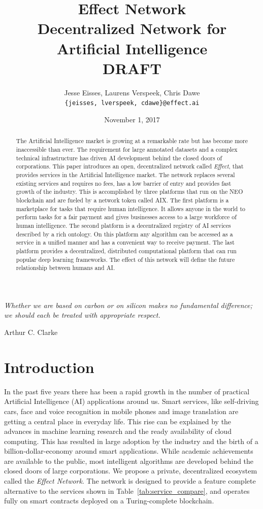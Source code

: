 \documentclass{article}
\title{Effect Network \\ \LARGE{Decentralized Network for Artificial Intelligence} \\ \vspace{24pt} \Large DRAFT}
\date{November 1, 2017}
\author{Jesse Eisses, Laurens Verspeek, Chris Dawe \\
  \small \texttt{\{jeisses, lverspeek, cdawe\}@effect.ai}}
\begin{document}
\maketitle
\thispagestyle{empty}

\begin{abstract}
  The Artificial Intelligence market is growing at a remarkable rate
  but has become more inaccessible than ever. The requirement for large 
  annotated datasets and a complex technical infrastructure has driven AI 
  development behind the closed doors of corporations. This paper 
  introduces an open, decentralized network called
  \emph{Effect}, that provides services in the Artificial Intelligence
  market. The network replaces several existing services and requires
  no fees, has a low barrier of entry and provides fast growth of the industry. 
  This is accomplished by three platforms that run on the NEO~\cite{neo}
  blockchain and are fueled by a network token called AIX. The first
  platform is a marketplace for tasks that require human
  intelligence. It allows anyone in the world 
  to perform tasks for a fair payment and gives businesses access
  to a large workforce of human intelligence. The second platform is a
  decentralized registry of AI services described by a rich
  ontology. On this platform any algorithm can be accessed as a 
  service in a unified manner and has a convenient way to receive payment. The last
  platform provides a decentralized, distributed computational
  platform that can run popular deep learning frameworks.
  The effect of this network will define the future relationship between humans and AI.
\end{abstract}
\nonumber
\newpage

\tableofcontents
\newpage

\epigraph{\textit{Whether we are based on carbon or on silicon makes
    no fundamental difference; we should each be treated with
    appropriate respect.}}{Arthur C. Clarke}

\section{Introduction}
In the past five years there has been a rapid growth in the number of
practical Artificial Intelligence (AI) applications around us. Smart
services, like self-driving cars, face and voice recognition in mobile
phones and image translation are getting a central place in everyday
life. This rise can be explained by the advances in machine learning
research and the ready availability of cloud computing. This has
resulted in large adoption by the industry and the birth of a
billion-dollar-economy around smart applications. While academic achievements are
available to the public, most intelligent algorithms are developed
behind the closed doors of large corporations. We propose a
private, decentralized ecosystem called the \emph{Effect Network}. The
network is designed to provide a feature complete alternative to the
services shown in Table~\ref{tab:service_compare}, and operates fully
on smart contracts deployed on a Turing-complete blockchain.
\end{document}
